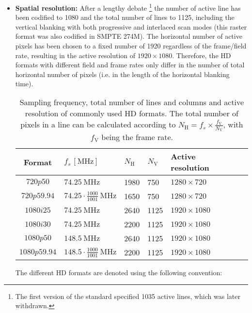 \begin{itemize}
\item \textbf{Spatial resolution:} 
After a lengthy debate \footnote{The first version of the standard specified 1035 active lines, which was later withdrawn.} the number of active line has been codified to 1080 and the total number of lines to 1125, including the vertical blanking with both progressive and interlaced scan modes (this raster format was also codified in SMPTE 274M).
The horizontal number of active pixels has been chosen to a fixed number of 1920 regardless of the frame/field rate, resulting in the active resolution of $1920 \times 1080$.
Therefore, the HD formats with different field and frame rates only differ in the number of total horizontal number of pixels (i.e. in the length of the horizontal blanking time).
%
\begin{table}[h!]
\caption{Sampling frequency, total number of lines and columns and active resolution of commonly used HD formats.
The total number of pixels in a line can be calculated according to $N_\mathrm{H} = f_s \times \frac{f_{\mathrm{V}}}{N_\mathrm{V}}$, with $f_{\mathrm{V}}$ being the frame rate.}
\renewcommand*{\arraystretch}{2.25}
\label{tab:viewing_dist}
\begin{center}
    \begin{tabular}[h!]{ @{}c | l | l | l | l | l @{} }%
		Format       &   $f_s \, [\mathrm{MHz}]$ 				& $N_\mathrm{H}$ & $N_\mathrm{V}$ & Active resolution \\ \hline
		$720p50$     &   $74.25~\mathrm{MHz}$    				& 1980     &  750  & $1280 \times 720$ \\
		$720p59.94$  &$74.25\cdot\frac{1000}{1001}~\mathrm{MHz}$& 1650     &  750  & $1280 \times 720$ \\
		$1080i25$ 	 &   $74.25~\mathrm{MHz}$    				& 2640     & 1125  & $1920 \times 1080$ \\
		$1080i30$  	 &   $74.25~\mathrm{MHz}$    				& 2200     & 1125  & $1920 \times 1080$ \\
		$1080p50$ 	 &   $148.5~\mathrm{MHz}$    		    	& 2640     & 1125  & $1920 \times 1080$ \\
		$1080p59.94$ &$148.5\cdot\frac{1000}{1001}~\mathrm{MHz}$& 2200     & 1125  & $1920 \times 1080$ 
        \end{tabular}
\end{center}
\end{table}
\vspace{3mm}
The different HD formats are denoted using the following convention:
\begin{itemize}

\end{itemize}
\end{itemize}
